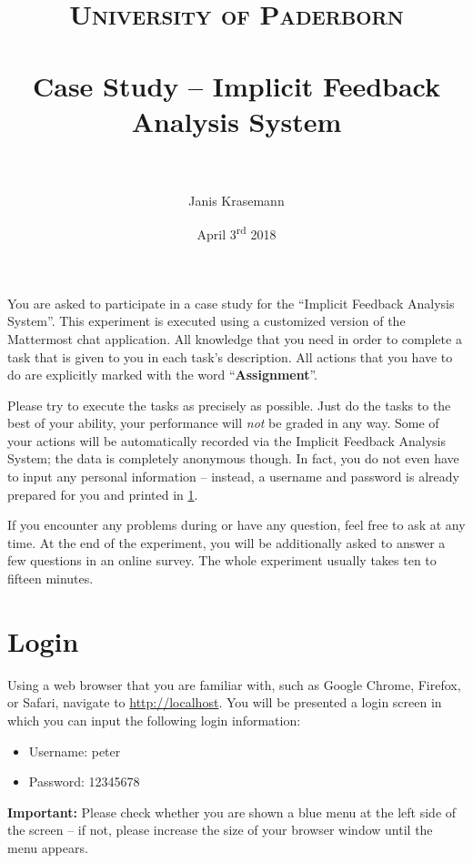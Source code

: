 \documentclass[paper=a4, fontsize=11pt]{scrartcl} %
\title{	
\normalfont \normalsize 
\textsc{University of Paderborn} \\ [25pt] %
\horrule{0.5pt} \\[0.4cm] %
\huge Case Study -- Implicit Feedback Analysis System \\ %
\horrule{2pt} \\[0.5cm] %
}
\author{Janis Krasemann} %
\date{April 3\textsuperscript{rd} 2018} %
\numberwithin{equation}{section} %
\numberwithin{figure}{section} %
\numberwithin{table}{section} %
\begin{document}
\maketitle %


You are asked to participate in a case study for the ``Implicit Feedback Analysis System''.
This experiment is executed using a customized version of the Mattermost chat application.
All knowledge that you need in order to complete a task that is given to you in each task's description.
All actions that you have to do are explicitly marked with the word ``\textbf{Assignment}''.

Please try to execute the tasks as precisely as possible.
Just do the tasks to the best of your ability, your performance will \emph{not} be graded in any way.
Some of your actions will be automatically recorded via the Implicit Feedback Analysis System; the data is completely anonymous though.
In fact, you do not even have to input any personal information -- instead, a username and password is already prepared for you and printed in \ref{task0}.

If you encounter any problems during or have any question, feel free to ask at any time.
At the end of the experiment, you will be additionally asked to answer a few questions in an online survey.
The whole experiment usually takes ten to fifteen minutes.


\section{Login}
\label{task0}

Using a web browser that you are familiar with, such as Google Chrome, Firefox, or Safari, navigate to \url{http://localhost}.
You will be presented a login screen in which you can input the following login information:

\begin{itemize}
\item Username: peter
\item Password: 12345678
\end{itemize}

\textbf{Important:} Please check whether you are shown a blue menu at the left side of the screen -- if not, please increase the size of your browser window until the menu appears.
\end{document}
